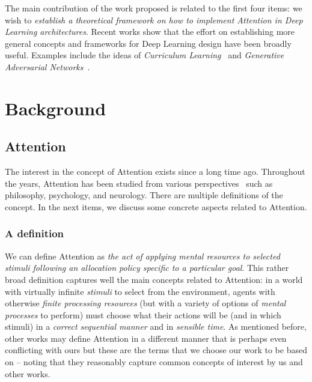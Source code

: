 \documentclass[English]{style/ic-tese-v3}
\begin{document}
The main contribution of the work proposed is related to the first four items:
we wish to
\emph{establish a theoretical framework on how to implement Attention in Deep Learning architectures}.
Recent works show that the effort on establishing more general concepts and frameworks for
Deep Learning design have been broadly useful.
Examples include the ideas of \emph{Curriculum Learning}~\cite{ref:curriculum}
and \emph{Generative Adversarial Networks}~\cite{ref:gans}.

\chapter{Background}
\section{Attention}
The interest in the concept of Attention exists since a long time ago.
Throughout the years, Attention has been studied
from various perspectives~\cite{ref:esther-thesis}
such as philosophy, psychology, and neurology.
There are multiple definitions of the concept.
In the next items, we discuss some concrete aspects related to Attention.

\subsection{A definition}
We can define Attention as
\emph{the act of applying mental resources to selected stimuli following an allocation policy specific to
    a particular goal}.
This rather broad definition captures well the main concepts related to Attention:
in a world with virtually infinite
\emph{stimuli} to select from the environment, agents with otherwise \emph{finite processing
resources} (but with a variety of options of \emph{mental processes} to perform) must choose what their
actions will be (and in which stimuli) in a \emph{correct sequential manner} and in \emph{sensible time}.
As mentioned before, other works may define Attention in a different manner
that is perhaps even conflicting with ours but
these are the terms that we choose our work to be based on -- noting that they
reasonably capture common concepts of interest by us and other works.~\cite{ref:helgason}
\end{document}
